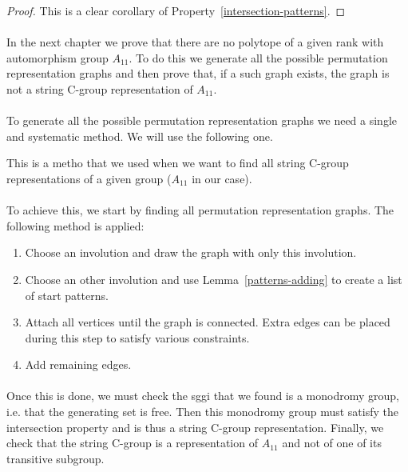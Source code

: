 \begin{proof}
  This is a clear corollary of Property~\ref{intersection-patterns}.
\end{proof}

\paragraph{}
In the next chapter we prove that there are no polytope of a given rank with automorphism group $A_{11}$. To do this we generate all the possible permutation representation graphs and then prove that, if a such graph exists, the graph is not a string C-group representation of $A_{11}$.

\paragraph{}
To generate all the possible permutation representation graphs we need a single and systematic method. We will use the following one.

\begin{method}
  \label{method}
  This is a metho that we used when we want to find all string C-group representations of a given group ($A_{11}$ in our case).

  \paragraph{}
  To achieve this, we start by finding all permutation representation graphs. The following method is applied:

  \begin{enumerate}
    \item Choose an involution and draw the graph with only this involution.
    \item Choose an other involution and use Lemma~\ref{patterns-adding} to create a list of start patterns.
    \item Attach all vertices until the graph is connected. Extra edges can be placed during this step to satisfy various constraints.
    \item Add remaining edges.
  \end{enumerate}

  \paragraph{}
  Once this is done, we must check the sggi that we found is a monodromy group, i.e. that the generating set is free. Then this monodromy group must satisfy the intersection property and is thus a string C-group representation. Finally, we check that the string C-group is a representation of $A_{11}$ and not of one of its transitive subgroup.

\end{method}

